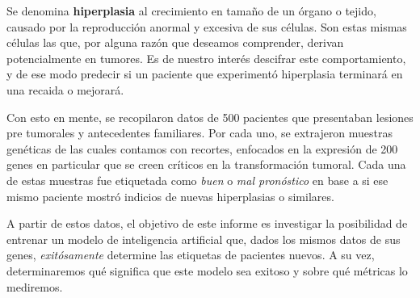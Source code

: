 Se denomina \textbf{hiperplasia} al crecimiento en tamaño de un órgano o tejido, causado por la reproducción anormal y excesiva de sus células. Son estas mismas células las que, por alguna razón que deseamos comprender, derivan potencialmente en tumores. Es de nuestro interés descifrar este comportamiento, y de ese modo predecir si un paciente que experimentó hiperplasia terminará en una recaida o mejorará. 

Con esto en mente, se recopilaron datos de 500 pacientes que presentaban lesiones pre tumorales y antecedentes familiares. Por cada uno, se extrajeron muestras genéticas de las cuales contamos con recortes, enfocados en la expresión de 200 genes en particular que se creen críticos en la transformación tumoral. Cada una de estas muestras fue etiquetada como \textit{buen} o \textit{mal pronóstico} en base a si ese mismo paciente mostró indicios de nuevas hiperplasias o similares.

A partir de estos datos, el objetivo de este informe es investigar la posibilidad de entrenar un modelo de inteligencia artificial que, dados los mismos datos de sus genes, \textit{exitósamente} determine las etiquetas de pacientes nuevos. A su vez, determinaremos qué significa que este modelo sea exitoso y sobre qué métricas lo mediremos.
